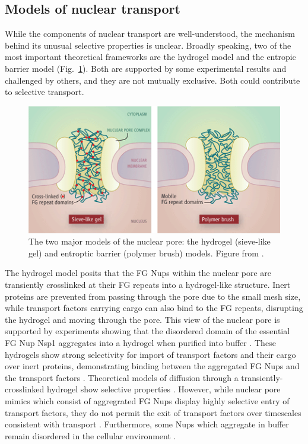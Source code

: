 \subsection{Models of nuclear transport}

While the components of nuclear transport are well-understood, the mechanism behind its unusual selective properties is unclear.  Broadly speaking, two of the most important theoretical frameworks are the hydrogel model and the entropic barrier model (Fig.~\ref{fig:hydrogel-entropic-brush}).  Both are supported by some experimental results and challenged by others, and they are not mutually exclusive.  Both could contribute to selective transport.

\begin{figure}
\centering
\includegraphics[width=0.6\linewidth]{figs/ch01/elbaum}
\caption[Two important models of nuclear transport.]{The two major models of the nuclear pore: the hydrogel (sieve-like gel) and entroptic barrier (polymer brush) models. Figure from \cite{elbaum06}.}
\label{fig:hydrogel-entropic-brush}
\end{figure}

The hydrogel model posits that the FG Nups within the nuclear pore are transiently crosslinked at their FG repeats into a hydrogel-like structure.  Inert proteins are prevented from passing through the pore due to the small mesh size, while transport factors carrying cargo can also bind to the FG repeats, disrupting the hydrogel and moving through the pore.  This view of the nuclear pore is supported by experiments showing that the disordered domain of the essential FG Nup Nsp1 aggregates into a hydrogel when purified into buffer \cite{frey06}.  These hydrogels show strong selectivity for import of transport factors and their cargo over inert proteins, demonstrating binding between the aggregated FG Nups and the transport factors \cite{frey07,ader10,kim15}.  Theoretical models of diffusion through a transiently-crosslinked hydrogel show selective properties \cite{ribbeck01, bickel02,gu19}.   However, while nuclear pore mimics which consist of aggregrated FG Nups display highly selective entry of transport factors, they do not permit the exit of transport factors over timescales consistent with transport \cite{frey07,ader10}.  Furthermore, some Nups which aggregate in buffer remain disordered in the cellular environment \cite{hough15}.

